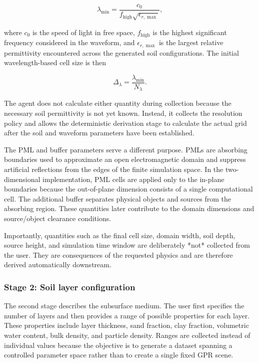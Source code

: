 \documentclass[journal]{IEEEtran}
\begin{document}
$$
\lambda_{\min} =
\frac{c_0}
{f_{\mathrm{high}}\sqrt{\epsilon_{r,\max}}},
$$

where \(c_0\) is the speed of light in free space, \(f_{\mathrm{high}}\) is the highest significant frequency considered in the waveform, and \(\epsilon_{r,\max}\) is the largest relative permittivity encountered across the generated soil configurations. The initial wavelength-based cell size is then

$$
\Delta_{\lambda} =
\frac{\lambda_{\min}}{N_{\lambda}}.
$$

The agent does not calculate either quantity during collection because the necessary soil permittivity is not yet known. Instead, it collects the resolution policy and allows the deterministic derivation stage to calculate the actual grid after the soil and waveform parameters have been established.

The PML and buffer parameters serve a different purpose. PMLs are absorbing boundaries used to approximate an open electromagnetic domain and suppress artificial reflections from the edges of the finite simulation space. In the two-dimensional implementation, PML cells are applied only to the in-plane boundaries because the out-of-plane dimension consists of a single computational cell. The additional buffer separates physical objects and sources from the absorbing region. These quantities later contribute to the domain dimensions and source/object clearance conditions.

Importantly, quantities such as the final cell size, domain width, soil depth, source height, and simulation time window are deliberately *not* collected from the user. They are consequences of the requested physics and are therefore derived automatically downstream.

\subsubsection{Stage 2: Soil layer configuration}

The second stage describes the subsurface medium. The user first specifies the number of layers and then provides a range of possible properties for each layer. These properties include layer thickness, sand fraction, clay fraction, volumetric water content, bulk density, and particle density. Ranges are collected instead of individual values because the objective is to generate a dataset spanning a controlled parameter space rather than to create a single fixed GPR scene.
\end{document}
